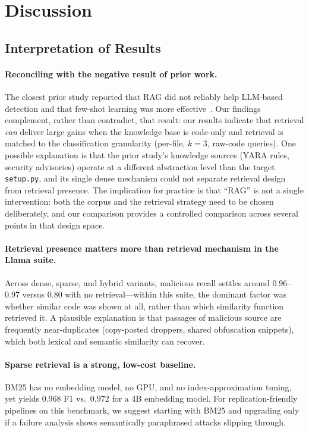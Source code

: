 \section{Discussion}
\label{sec:discussion}

\subsection{Interpretation of Results}
\label{sec:interpretation}

\paragraph{Reconciling with the negative result of prior work.} The closest
prior study reported that RAG did not reliably help LLM-based detection and
that few-shot learning was more effective~\cite{ease2025rag}. Our findings
complement, rather than contradict, that result: our results indicate that
retrieval \emph{can} deliver large gains when the knowledge base is code-only
and retrieval is matched to the classification granularity (per-file, $k=3$,
raw-code queries). One possible explanation is that the prior study's
knowledge sources (YARA rules, security advisories) operate at a different
abstraction level than the target \texttt{setup.py}, and its single dense
mechanism could not separate retrieval design from retrieval presence. The
implication for practice is that ``RAG'' is not a single intervention: both
the corpus and the retrieval strategy need to be chosen deliberately, and our
comparison provides a controlled comparison across several points in that
design space.

\paragraph{Retrieval presence matters more than retrieval mechanism in the Llama suite.}
Across dense, sparse, and hybrid variants, malicious recall settles around
0.96--0.97 versus 0.80 with no retrieval---within this suite, the dominant
factor was whether similar code was shown at all, rather than which
similarity function retrieved it. A plausible explanation is that passages of
malicious source are frequently near-duplicates (copy-pasted droppers,
shared obfuscation snippets), which both lexical and semantic similarity can
recover.

\paragraph{Sparse retrieval is a strong, low-cost baseline.} BM25 has no
embedding model, no GPU, and no index-approximation tuning, yet yields 0.968
F1 vs.\ 0.972 for a 4B embedding model. For replication-friendly pipelines on
this benchmark, we suggest starting with BM25 and upgrading only if a failure
analysis shows semantically paraphrased attacks slipping through.

